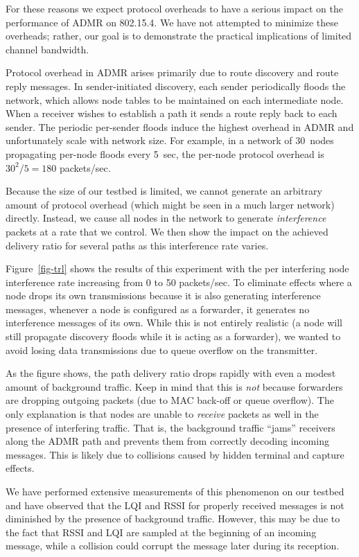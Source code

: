 For these reasons we expect protocol overheads to have a serious impact
on the performance of ADMR on 802.15.4. We have not attempted to 
minimize these overheads; rather, our goal is to demonstrate the
practical implications of limited channel bandwidth.

Protocol overhead in ADMR arises primarily due to 
route discovery and route reply messages. In sender-initiated
discovery, each sender periodically floods the network, which 
allows node tables to be maintained on each intermediate node.
When a receiver wishes to establish a path it sends a route reply
back to each sender. The periodic per-sender floods induce the
highest overhead in ADMR and unfortunately scale with network size.
For example, in a network of 30~nodes propagating
per-node floods every 5~sec, the per-node protocol overhead is
$30^2 / 5 = 180$ packets/sec.

Because the size of our testbed is limited, we cannot generate an
arbitrary amount of protocol overhead (which might be seen in a
much larger network) directly. Instead, we cause all nodes in the 
network to generate {\em interference} packets at a rate that we 
control. We then show the impact on the achieved delivery ratio 
for several paths as this interference rate varies.

Figure~\ref{fig-trl} shows the results of this experiment with the per
interfering node interference rate increasing from 0 to 50
packets/sec.  To eliminate effects where a node drops its own
transmissions because it is also generating interference messages,
whenever a node is configured as a forwarder, it generates no
interference messages of its own. While this is not entirely realistic
(a node will still propagate discovery floods while it is acting as a
forwarder), we wanted to avoid losing data transmissions due to queue
overflow on the transmitter.


As the figure shows, the path delivery ratio drops rapidly 
with even a modest amount of background traffic. Keep in mind
that this is {\em not} because forwarders are dropping 
outgoing packets (due to MAC back-off or queue overflow). The only
explanation is that nodes are unable to {\em receive}
packets as well in the presence of interfering traffic. 
That is, the background traffic ``jams'' receivers along the 
ADMR path and prevents them from correctly decoding incoming messages. 
This is likely due to collisions caused by hidden terminal and capture effects. 

We have performed extensive measurements of this 
phenomenon on our testbed and have observed that the LQI and RSSI for
properly received messages is not diminished by the presence 
of background traffic. However, this may be due to the fact that
RSSI and LQI are sampled at the beginning of an incoming message,
while a collision could corrupt the message later during its reception.

